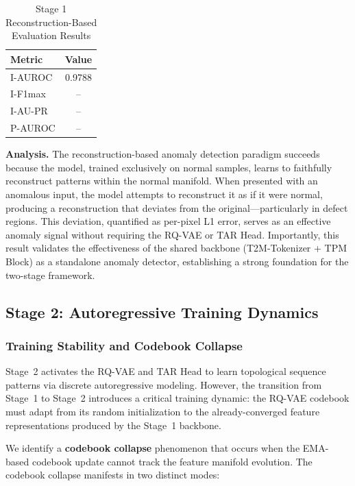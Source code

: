 \documentclass[lettersize,journal]{IEEEtran}
\begin{document}
\begin{table}[!t]
\caption{Stage 1 Reconstruction-Based Evaluation Results\label{tab:stage1_results}}
\centering
\begin{tabular}{@{}lc@{}}
\toprule
\textbf{Metric} & \textbf{Value} \\
\midrule
I-AUROC & 0.9788 \\
I-F1max & -- \\
I-AU-PR & -- \\
P-AUROC & -- \\
\bottomrule
\end{tabular}
\end{table}

\noindent\textbf{Analysis.} The reconstruction-based anomaly detection paradigm succeeds because the model, trained exclusively on normal samples, learns to faithfully reconstruct patterns within the normal manifold. When presented with an anomalous input, the model attempts to reconstruct it as if it were normal, producing a reconstruction that deviates from the original---particularly in defect regions. This deviation, quantified as per-pixel L1 error, serves as an effective anomaly signal without requiring the RQ-VAE or TAR Head. Importantly, this result validates the effectiveness of the shared backbone (T2M-Tokenizer + TPM Block) as a standalone anomaly detector, establishing a strong foundation for the two-stage framework.

\subsection{Stage 2: Autoregressive Training Dynamics}

\subsubsection{Training Stability and Codebook Collapse}

Stage~2 activates the RQ-VAE and TAR Head to learn topological sequence patterns via discrete autoregressive modeling. However, the transition from Stage~1 to Stage~2 introduces a critical training dynamic: the RQ-VAE codebook must adapt from its random initialization to the already-converged feature representations produced by the Stage~1 backbone.

We identify a \textbf{codebook collapse} phenomenon that occurs when the EMA-based codebook update cannot track the feature manifold evolution. The codebook collapse manifests in two distinct modes:
\end{document}
